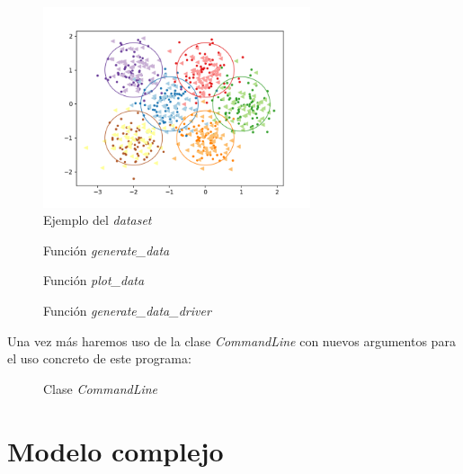 \documentclass[6pt]{../../shared/AiTex}
\begin{document}
\begin{figure}[H]
    \centering
    \includegraphics[width=0.7\textwidth]{./images/dataset.png}
    \caption{Ejemplo del \textit{dataset}}
    \label{fig:digitos}
\end{figure}

\begin{figure}[H]
    \centering
    
    \caption{Función \textit{generate\_data}}
    \label{fig:generate_data}
\end{figure}

\begin{figure}[H]
    \centering
    
    \caption{Función \textit{plot\_data}}
    \label{fig:plot_data}
\end{figure}

\begin{figure}[H]
    \centering
    
    \caption{Función \textit{generate\_data\_driver}}
    \label{fig:generate_data_driver}
\end{figure}

Una vez más haremos uso de la clase \textit{CommandLine} con nuevos argumentos para el uso concreto de este programa:

\begin{figure}[H]
    \centering
    
    \caption{Clase \textit{CommandLine}}
    \label{fig:CommandLine}
\end{figure}

\section{Modelo complejo}
\end{document}
